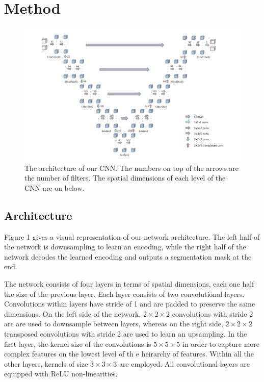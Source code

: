 \documentclass[11pt]{article}
\begin{document}
\section{Method}
\begin{figure}
\includegraphics[width=\textwidth]{figures/fig2.png}
\caption{The architecture of our CNN. The numbers on top of the arrows are the number of filters. The spatial dimensions of each level of the CNN are on below.}
\end{figure}

\subsection{Architecture}
Figure 1 gives a visual representation of our network architecture. The left half of the network is downsampling to learn an encoding, while the right half of the network decodes the learned encoding and outputs a segmentation mask at the end.

The network consists of four layers in terms of spatial dimensions, each one half the size of the previous layer. Each layer consists of two convolutional layers. Convolutions within layers have stride of 1 and are padded to preserve the same dimensions. On the left side of the network, $2 \times 2 \times 2$ convolutions with stride 2 are are used to downsample between layers, whereas on the right side, $2 \times 2 \times 2$ transposed convolutions with stride 2 are used to learn an upsampling. In the first layer, the kernel size of the convolutions is $5 \times 5 \times 5$ in order to capture more complex features on the lowest level of th e heirarchy of features. Within all the other layers, kernels of size $3 \times 3 \times 3$ are employed. All convolutional layers are equipped with ReLU non-linearities.
\end{document}
